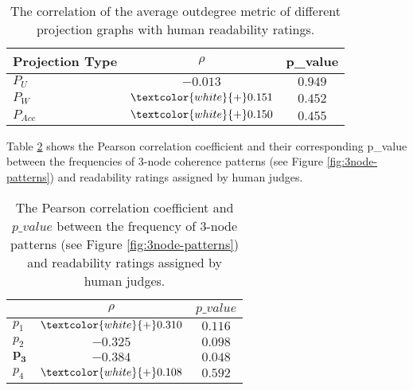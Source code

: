 \begin{table}[!ht]
	\begin{center}
		\begin{tabular}{lcc}
			\hline
 			Projection Type		& $\rho$ 						& p\_value\\
 			\hline
			$P_U$ 				& $-0.013$ 						& $0.949$ \\
			$P_W$ 				& $\textcolor{white}{+}0.151$  	& $0.452$ \\
			$P_{Acc}$ 			& $\textcolor{white}{+}0.150$ 	& $0.455$ \\
			\hline
		\end{tabular}
	\end{center}
	\caption{The correlation of the average outdegree metric of different projection graphs with human readability ratings.}
 	\label{tab:correlation-outdegree}
\end{table}


Table \ref{tab:correlation-3node} shows the Pearson correlation coefficient and their corresponding p\_value between the frequencies of 3-node coherence patterns (see Figure \ref{fig:3node-patterns}) and readability ratings assigned by human judges. 

\begin{table}[!ht]
	\begin{center}
		\begin{tabular}{lcc}
		\hline
  	 	& $\rho$ 		& $p\_value$ 								    \\
  	 	\hline
 		$p_1$ 			& $\textcolor{white}{+}0.310$ & $0.116$ 		\\
 		$p_2$ 			& $-0.325$ 				      & $0.098$ 		\\
		$\mathbf{p_3}$ 	& $\mathbf{-0.384}$ 		  & $\mathbf{0.048}$\\
 		$p_4$ 			& $\textcolor{white}{+}0.108$ & $0.592$			\\
 		\hline
		\end{tabular}
	\end{center}
	\caption{The Pearson correlation coefficient and $p\_value$ between the frequency of 3-node patterns (see Figure \ref{fig:3node-patterns}) and readability ratings assigned by human judges.} 
 	\label{tab:correlation-3node}
\end{table}

